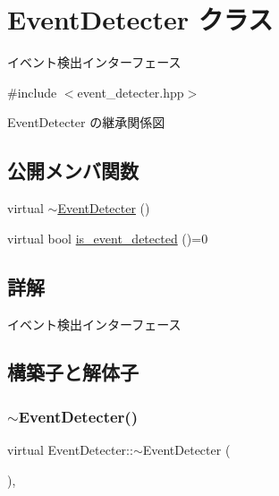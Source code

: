 \hypertarget{class_event_detecter}{}\section{Event\+Detecter クラス}
\label{class_event_detecter}


イベント検出インターフェース  




{\ttfamily \#include $<$event\+\_\+detecter.\+hpp$>$}



Event\+Detecter の継承関係図
\subsection*{公開メンバ関数}
\begin{DoxyCompactItemize}
\item 
virtual \mbox{\hyperlink{class_event_detecter_a773bd1560f0c7ceb26f2919c485a6737}{$\sim$\+Event\+Detecter}} ()
\item 
virtual bool \mbox{\hyperlink{class_event_detecter_ae5f2c62e1226dcd9434eef3db92a8a70}{is\+\_\+event\+\_\+detected}} ()=0
\end{DoxyCompactItemize}


\subsection{詳解}
イベント検出インターフェース 

\subsection{構築子と解体子}
\mbox{\label{class_event_detecter_a773bd1560f0c7ceb26f2919c485a6737}} 
\subsubsection{\texorpdfstring{$\sim$EventDetecter()}{~EventDetecter()}}
{\footnotesize\ttfamily virtual Event\+Detecter\+::$\sim$\+Event\+Detecter (\begin{DoxyParamCaption}{ }\end{DoxyParamCaption})\hspace{0.3cm}{\ttfamily [inline]}, {\ttfamily [virtual]}}



